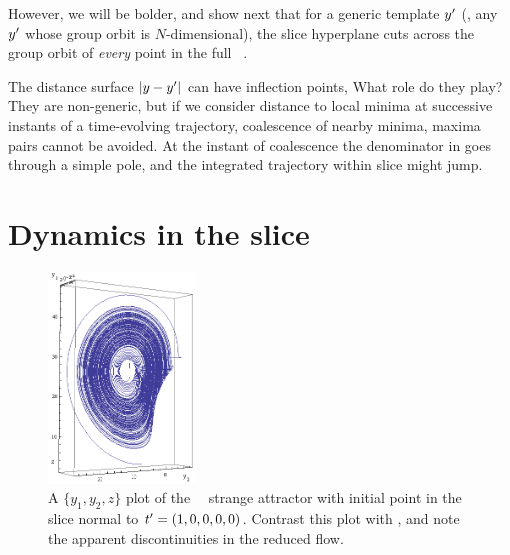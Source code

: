 \documentclass[%
 reprint,%
 amssymb, amsmath,%
 aip,cha,%
 graphicx
]{revtex4-1}
\begin{document}
However, we will be bolder, and show next that for a generic template
${y'}$ (\ie, any ${y'}$ whose group orbit is $N$-dimensional), the
slice hyperplane  cuts across the group orbit of {\em
every} point in the full \statesp\ \pS.





The distance surface $|y - {y'}|$ can have inflection points,
What role do they play? They are non-generic, but if we consider distance
to local minima at successive instants of a time-evolving trajectory,
coalescence of
nearby minima, maxima pairs cannot be avoided. At the instant of
coalescence the denominator in  goes through a simple
pole, and the integrated trajectory within slice might jump.



\subsection{}
\subsubsection{}


\section{Dynamics in the slice}
\label{sect:MovFrameODE}


 \begin{figure}
 \includegraphics[width=0.35\textwidth]{CLEreduced}%
 \caption{\label{fig:CLErx2y1z}
A $\{y_1,y_2,z\}$ plot of the \reducedsp\ \cLf\ strange attractor
with initial point
in the
slice normal to $t'_{}=(1,0,0,0,0)$. Contrast this plot with
, and note the apparent discontinuities in the
reduced flow.
 }%
 \end{figure}
\end{document}
